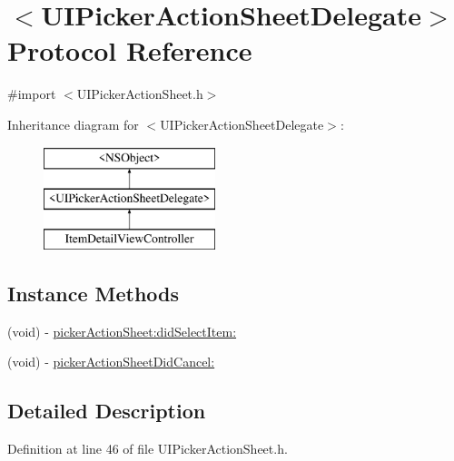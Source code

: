 \hypertarget{protocol_u_i_picker_action_sheet_delegate-p}{\section{$<$U\-I\-Picker\-Action\-Sheet\-Delegate$>$ Protocol Reference}
\label{protocol_u_i_picker_action_sheet_delegate-p}
}


{\ttfamily \#import $<$U\-I\-Picker\-Action\-Sheet.\-h$>$}

Inheritance diagram for $<$U\-I\-Picker\-Action\-Sheet\-Delegate$>$\-:\begin{figure}[H]
\begin{center}
\leavevmode
\includegraphics[height=3.000000cm]{protocol_u_i_picker_action_sheet_delegate-p}
\end{center}
\end{figure}
\subsection*{Instance Methods}
\begin{DoxyCompactItemize}
\item 
(void) -\/ \hyperlink{protocol_u_i_picker_action_sheet_delegate-p_a153d47a601c08ff77ae4c4e9dbbe4df1}{picker\-Action\-Sheet\-:did\-Select\-Item\-:}
\item 
(void) -\/ \hyperlink{protocol_u_i_picker_action_sheet_delegate-p_a1e78a6acdc0af144de2bd9ef80d7c3f9}{picker\-Action\-Sheet\-Did\-Cancel\-:}
\end{DoxyCompactItemize}


\subsection{Detailed Description}


Definition at line 46 of file U\-I\-Picker\-Action\-Sheet.\-h.



